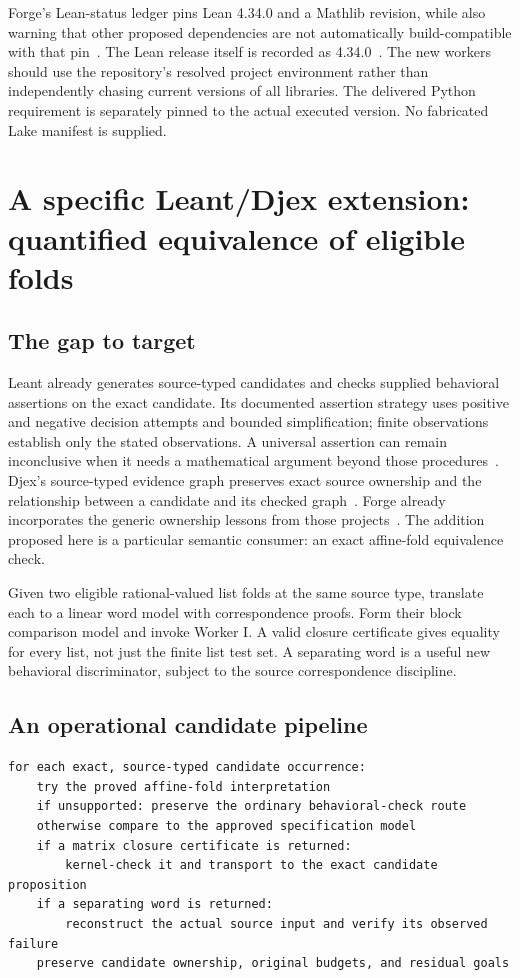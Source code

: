 Forge's Lean-status ledger pins Lean 4.34.0 and a Mathlib revision, while also
warning that other proposed dependencies are not automatically build-compatible
with that pin~\cite{forge-lean}. The Lean release itself is recorded as
4.34.0~\cite{lean-release}. The new workers should use the repository's resolved
project environment rather than independently chasing current versions of all
libraries. The delivered Python requirement is separately pinned to the actual
executed version. No fabricated Lake manifest is supplied.

\section{A specific Leant/Djex extension: quantified equivalence of eligible folds}
\label{sec:leant}

\subsection{The gap to target}

Leant already generates source-typed candidates and checks supplied behavioral
assertions on the exact candidate. Its documented assertion strategy uses
positive and negative decision attempts and bounded simplification; finite
observations establish only the stated observations. A universal assertion can
remain inconclusive when it needs a mathematical argument beyond those
procedures~\cite{leant-behavior}.
Djex's source-typed evidence graph preserves exact source ownership and the
relationship between a candidate and its checked graph~\cite{djex-graph}.
Forge already incorporates the generic ownership lessons from those
projects~\cite{forge-transfer}. The addition proposed here is a particular
semantic consumer: an exact affine-fold equivalence check.

Given two eligible rational-valued list folds at the same source type, translate
each to a linear word model with correspondence proofs. Form their block
comparison model and invoke Worker I. A valid closure certificate gives equality
for every list, not just the finite list test set. A separating word is a useful
new behavioral discriminator, subject to the source correspondence discipline.

\subsection{An operational candidate pipeline}

\begin{lstlisting}
for each exact, source-typed candidate occurrence:
    try the proved affine-fold interpretation
    if unsupported: preserve the ordinary behavioral-check route
    otherwise compare to the approved specification model
    if a matrix closure certificate is returned:
        kernel-check it and transport to the exact candidate proposition
    if a separating word is returned:
        reconstruct the actual source input and verify its observed failure
    preserve candidate ownership, original budgets, and residual goals
\end{lstlisting}


